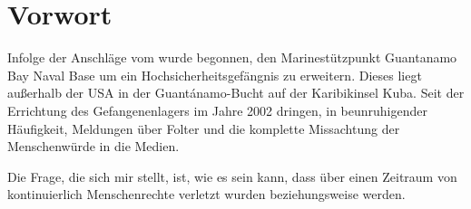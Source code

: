 \section{Vorwort}
Infolge der Anschläge vom  wurde begonnen, den Marinestützpunkt Guantanamo
Bay Naval Base um ein Hochsicherheitsgefängnis zu erweitern. Dieses liegt außerhalb
der USA in der Guantánamo-Bucht auf der Karibikinsel Kuba. Seit der Errichtung des Gefangenenlagers
im Jahre 2002 dringen, in beunruhigender Häufigkeit, Meldungen über Folter
und die komplette Missachtung der Menschenwürde in die Medien.

Die Frage, die sich mir stellt, ist, wie es sein kann, dass über einen Zeitraum von
 kontinuierlich Menschenrechte verletzt wurden beziehungsweise werden.
